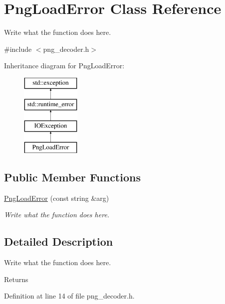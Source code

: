 \hypertarget{classPngLoadError}{\section{Png\+Load\+Error Class Reference}
\label{classPngLoadError}
}


Write what the function does here.  




{\ttfamily \#include $<$png\+\_\+decoder.\+h$>$}

Inheritance diagram for Png\+Load\+Error\+:\begin{figure}[H]
\begin{center}
\leavevmode
\includegraphics[height=4.000000cm]{classPngLoadError}
\end{center}
\end{figure}
\subsection*{Public Member Functions}
\begin{DoxyCompactItemize}
\item 
\hyperlink{classPngLoadError_afa477343655020d65c982aeedb118979}{Png\+Load\+Error} (const string \&arg)
\begin{DoxyCompactList}\small\item\em Write what the function does here. \end{DoxyCompactList}\end{DoxyCompactItemize}


\subsection{Detailed Description}
Write what the function does here. 

\begin{DoxyReturn}{Returns}

\end{DoxyReturn}


Definition at line 14 of file png\+\_\+decoder.\+h.



